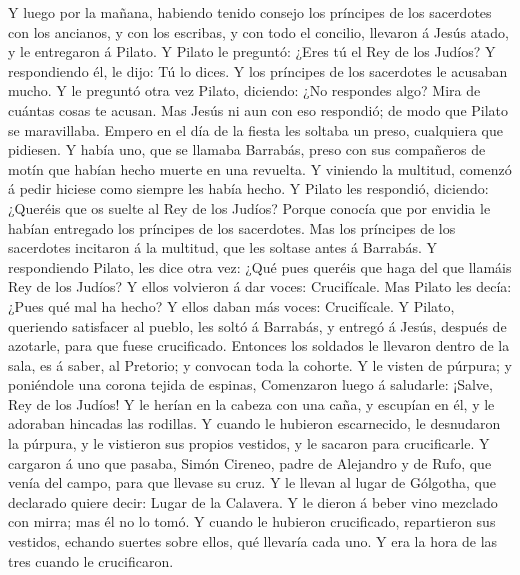  Y luego por la mañana, habiendo tenido consejo los
príncipes de los sacerdotes con los ancianos, y con los escribas, y con
todo el concilio, llevaron á Jesús atado, y le entregaron á Pilato.
 Y Pilato le preguntó: ¿Eres tú el Rey de los Judíos? Y
respondiendo él, le dijo: Tú lo dices.  Y los príncipes de
los sacerdotes le acusaban mucho.  Y le preguntó otra vez
Pilato, diciendo: ¿No respondes algo? Mira de cuántas cosas te acusan.
 Mas Jesús ni aun con eso respondió; de modo que Pilato se
maravillaba.  Empero en el día de la fiesta les soltaba un
preso, cualquiera que pidiesen.  Y había uno, que se llamaba
Barrabás, preso con sus compañeros de motín que habían hecho muerte en
una revuelta.  Y viniendo la multitud, comenzó á pedir
hiciese como siempre les había hecho.  Y Pilato les
respondió, diciendo: ¿Queréis que os suelte al Rey de los Judíos?
 Porque conocía que por envidia le habían entregado los
príncipes de los sacerdotes.  Mas los príncipes de los
sacerdotes incitaron á la multitud, que les soltase antes á Barrabás.
 Y respondiendo Pilato, les dice otra vez: ¿Qué pues
queréis que haga del que llamáis Rey de los Judíos?  Y
ellos volvieron á dar voces: Crucifícale.  Mas Pilato les
decía: ¿Pues qué mal ha hecho? Y ellos daban más voces: Crucifícale.
 Y Pilato, queriendo satisfacer al pueblo, les soltó á
Barrabás, y entregó á Jesús, después de azotarle, para que fuese
crucificado.  Entonces los soldados le llevaron dentro de
la sala, es á saber, al Pretorio; y convocan toda la cohorte.
 Y le visten de púrpura; y poniéndole una corona tejida de
espinas,  Comenzaron luego á saludarle: ¡Salve, Rey de los
Judíos!  Y le herían en la cabeza con una caña, y escupían
en él, y le adoraban hincadas las rodillas.  Y cuando le
hubieron escarnecido, le desnudaron la púrpura, y le vistieron sus
propios vestidos, y le sacaron para crucificarle.  Y
cargaron á uno que pasaba, Simón Cireneo, padre de Alejandro y de Rufo,
que venía del campo, para que llevase su cruz.  Y le llevan
al lugar de Gólgotha, que declarado quiere decir: Lugar de la Calavera.
 Y le dieron á beber vino mezclado con mirra; mas él no lo
tomó.  Y cuando le hubieron crucificado, repartieron sus
vestidos, echando suertes sobre ellos, qué llevaría cada uno.
 Y era la hora de las tres cuando le crucificaron.
